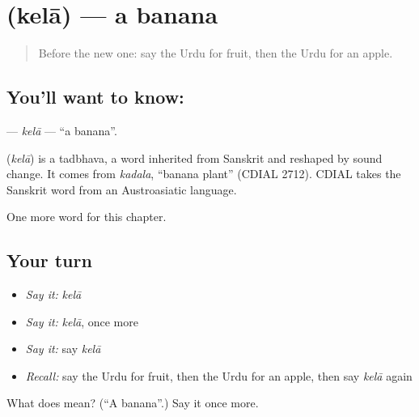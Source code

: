 \section[\texorpdfstring{\ur{کیلا} (kelā)}{کیلا (kelā)}]{ (kelā) — a banana}

\label{lesson:UR-C54-kela}



\begin{quote}
Before the new one: say the Urdu for fruit, then the Urdu for an apple.
\end{quote}

\subsection*{You'll want to know: }
\textbf{} — \emph{kelā} — \textquotedblleft{}a banana\textquotedblright{}.

\begin{cousinweb}
\textbf{} (\emph{kelā}) is a tadbhava, a word inherited from Sanskrit and reshaped by sound change. It comes from \emph{kadala}, \textquotedblleft{}banana plant\textquotedblright{} (CDIAL 2712). CDIAL takes the Sanskrit word from an Austroasiatic language.
\end{cousinweb}

\begin{grammarlens}[title={What you've built}]
One more word for this chapter.
\end{grammarlens}

\subsection*{Your turn}
\begin{itemize}
\raggedright
  \item \emph{Say it:} \emph{kelā}
  \item \emph{Say it:} \emph{kelā}, once more
  \item \emph{Say it:} say \emph{kelā}
  \item \emph{Recall:} say the Urdu for fruit, then the Urdu for an apple, then say \emph{kelā} again
\end{itemize}

\begin{tcolorbox}[breakable,colback=teal!4,colframe=teal!35!black,title={Before you move on}]
What does  mean? (\textquotedblleft{}A banana\textquotedblright{}.) Say it once more.
\end{tcolorbox}
